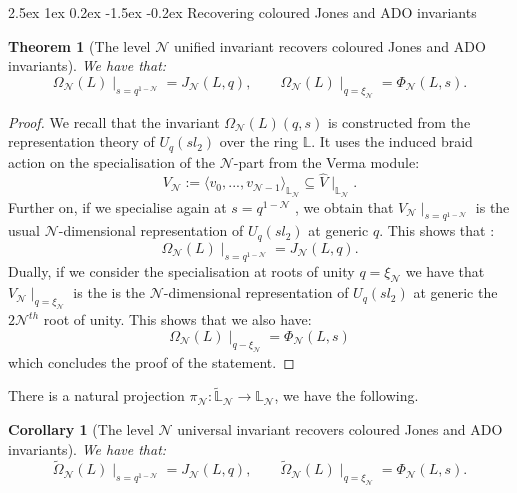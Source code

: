 \documentclass[reqno,a4paper,11pt]{amsart}
\makeatletter
\numberwithin{equation}{section}
\numberwithin{figure}{section}
\theoremstyle{definition}
\theoremstyle{plain}
\newtheorem{thm}[defn]{Theorem}
\newtheorem{coro}[defn]{Corollary}
\renewcommand*{\subsection}{\@startsection{subsection}{2}{\z@}%
	{2.5ex \@plus 1ex \@minus 0.2ex}%
	{-1.5ex \@plus -0.2ex}%
	{\normalfont\normalsize\bfseries}}
\newcommand{\Li}{{\mathbb L}}
\newcommand{\cN}{\mathcal{N}}
\makeatother
\begin{document}
 \subsection{Recovering coloured Jones and ADO invariants} 
 \begin{thm}[The level $\cN$ unified invariant recovers coloured Jones and ADO invariants]\label{JA1} We have that: 
 \begin{equation*}
\Omega_{\cN}(L)\mid_{s = q^{1-\mathcal{N}}} = J_{\mathcal{N}}(L, q), \qquad
\Omega_{\cN}(L)\mid_{q=\xi_{\cN}}=\Phi_{\mathcal{N}}(L, s). 
\end{equation*}
 \end{thm}
%
\begin{proof}
We recall that the invariant $\Omega_{\cN}(L)(q,s)$ is constructed from the representation theory of $U_q(sl_2)$ over the ring $\Li$. It uses the induced braid action on the specialisation of the $\cN$-part from the Verma module:
$$
V_{\cN}:=\langle v_{0},...,v_{\cN-1}\rangle_{\Li_{\cN}} \subseteq \hat{V}\mid_{\Li_{\cN}}.
$$
Further on, if we specialise again at $s = q^{1-\mathcal{N}}$ , we obtain that $V_{\cN}\mid _{s = q^{1-\mathcal{N}}}$ is the usual $\cN$-dimensional representation of $U_q(sl_2)$ at generic $q$. This shows that :
$$
\Omega_{\cN}(L)\mid_{s = q^{1-\mathcal{N}}} = J_{\mathcal{N}}(L, q).
$$
Dually, if we consider the specialisation at roots of unity $q=\xi_{\cN}$ we have that $V_{\cN}\mid_{q=\xi_{\cN}}$ is the is the $\cN$-dimensional representation of $U_q(sl_2)$ at generic the $2\cN^{th}$ root of unity. This shows that we also have:
$$
\Omega_{\cN}(L)\mid_{q-\xi_{\cN}} = \Phi_{\mathcal{N}}(L, s)
$$
which concludes the proof of the statement.
\end{proof}
%
There is a natural projection $\pi_\cN : \widetilde\Li_\cN \to \Li_\cN$, we have the following.
%
  \begin{coro}[The level $\cN$ universal invariant recovers coloured Jones and ADO invariants] We have that: \begin{equation*}
 \widetilde{\Omega}_{\cN}(L)\mid_{s = q^{1-\mathcal{N}}} 
 =
  J_{\mathcal{N}}(L, q), \qquad
\widetilde{\Omega}_{\cN}(L)\mid_{q=\xi_{\cN}}=\Phi_{\mathcal{N}}(L, s). 
\end{equation*}
 \end{coro}
% 
\end{document}
